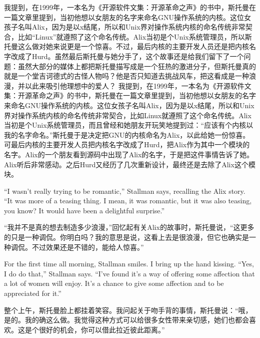 \ifdefined\chs
\ifdefined\vone
我提到，在1999年，一本名为《开源软件文集：开源革命之声》的书中，斯托曼在一篇文章里提到，当初他想以女朋友的名字来命名GNU操作系统的内核。这位女孩子名叫Alix，因为是以x结尾，所以和Unix界对操作系统内核的命名传统非常契合，比如``Linux''就遵照了这个命名传统。Alix当初是个Unix系统管理员，所以斯托曼这么做对她来说更是一个惊喜。不过，最后内核的主要开发人员还是把内核名字改成了Hurd。虽然最后斯托曼与她分手了，这个故事还是给我们留下了一个问题：虽然大部分的媒体上都把斯托曼描写成是一个狂热的激进分子，但斯托曼真的就是一个堂吉诃德式的古怪人物吗？他是否只知道去挑战风车，把这看成是一种浪漫，并以此来吸引他理想中的爱人？
\fi
\ifdefined\vtwo
我提到，在1999年，一本名为《开源软件文集：开源革命之声》的书中，斯托曼在一篇文章里提到，当初他想以女朋友的名字来命名GNU操作系统的内核。这位女孩子名叫Alix，因为是以x结尾，所以和Unix界对操作系统内核的命名传统非常契合，比如Linux就遵照了这个命名传统。Alix当初是个Unix系统管理员，而且曾经和她朋友开玩笑地提到过：``应该有个内核以我的名字命名。''斯托曼于是决定把GNU的内核命名为Alix，以此给她一份惊喜。可最后内核的主要开发人员把内核名字改成了Hurd，把Alix作为其中一个模块的名字。Alix的一个朋友看到源码中出现了Alix的名字，于是把这件事情告诉了她。Alix听后非常感动。之后Hurd又经历了几次重新设计，最终还是去除了Alix这个模块。
\fi
\fi

\ifdefined\vtwo
\ifdefined\eng
``I wasn't really trying to be romantic,'' Stallman says, recalling the Alix story. ``It was more of a teasing thing. I mean, it was romantic, but it was also teasing, you know? It would have been a delightful surprise.''
\fi

\ifdefined\vtwo
``我并不是真的想去制造多少浪漫，''回忆起有关Alix的故事时，斯托曼说，``这更多的只是一种调侃。你明白吗？我的意思是说，这看上去是很浪漫，但它也确实是一种调侃。不过效果还是不错的，能给人惊喜。''
\fi
\fi

\ifdefined\eng
For the first time all morning, Stallman smiles. I bring up the hand kissing. ``Yes, I do do that,'' Stallman says. ``I've found it's a way of offering some affection that a lot of women will enjoy. It's a chance to give some affection and to be appreciated for it.''
\fi

\ifdefined\chs
整个上午，斯托曼脸上都挂着笑容。我问起关于吻手背的事情，斯托曼说：``哦，是的。我的确这么做。我觉得这种方式可以给很多女性带来亲切感，她们也都会喜欢。这是个很好的机会，你可以借此拉近彼此距离。''
\fi

